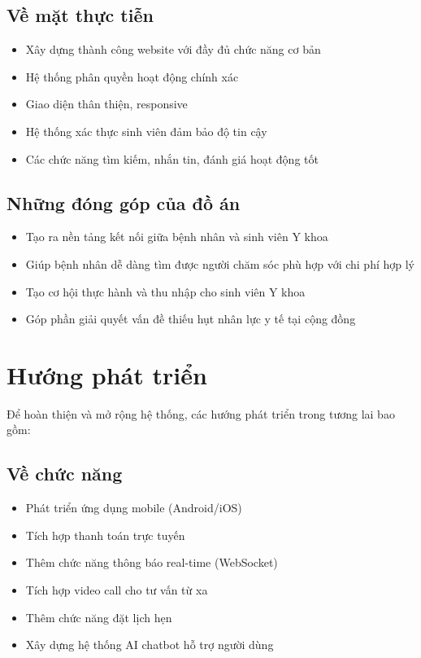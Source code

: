 \documentclass[a4paper,12pt]{report}
\begin{document}
\subsection{Về mặt thực tiễn}
\begin{itemize}
    \item Xây dựng thành công website với đầy đủ chức năng cơ bản
    \item Hệ thống phân quyền hoạt động chính xác
    \item Giao diện thân thiện, responsive
    \item Hệ thống xác thực sinh viên đảm bảo độ tin cậy
    \item Các chức năng tìm kiếm, nhắn tin, đánh giá hoạt động tốt
\end{itemize}

\subsection{Những đóng góp của đồ án}
\begin{itemize}
    \item Tạo ra nền tảng kết nối giữa bệnh nhân và sinh viên Y khoa
    \item Giúp bệnh nhân dễ dàng tìm được người chăm sóc phù hợp với chi phí hợp lý
    \item Tạo cơ hội thực hành và thu nhập cho sinh viên Y khoa
    \item Góp phần giải quyết vấn đề thiếu hụt nhân lực y tế tại cộng đồng
\end{itemize}

\section{Hướng phát triển}

Để hoàn thiện và mở rộng hệ thống, các hướng phát triển trong tương lai bao gồm:

\subsection{Về chức năng}
\begin{itemize}
    \item Phát triển ứng dụng mobile (Android/iOS)
    \item Tích hợp thanh toán trực tuyến
    \item Thêm chức năng thông báo real-time (WebSocket)
    \item Tích hợp video call cho tư vấn từ xa
    \item Thêm chức năng đặt lịch hẹn
    \item Xây dựng hệ thống AI chatbot hỗ trợ người dùng
\end{itemize}
\end{document}
